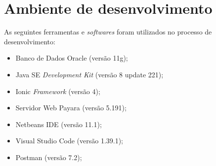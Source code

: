 \break

\section{Ambiente de desenvolvimento}

As seguintes ferramentas e \textit{softwares} foram utilizados no processo de desenvolvimento:

\begin{itemize}
    \item Banco de Dados Oracle (versão 11g);
    \item Java SE \textit{Development Kit} (versão 8 update 221);
    \item Ionic \textit{Framework} (versão 4);
    \item Servidor Web Payara (versão 5.191);
    \item Netbeans IDE (versão 11.1);
    \item Visual Studio Code (versão 1.39.1);
    \item Postman (versão 7.2);
\end{itemize}